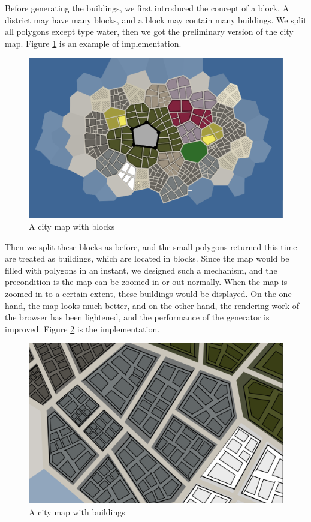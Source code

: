 Before generating the buildings, we first introduced the concept of a block. A district may have many blocks, and a block may contain many buildings. We split all polygons except type water, then we got the preliminary version of the city map. Figure \ref{fig:city blocks} is an example of implementation.

\begin{figure}[htbp]
  \includegraphics[width=\textwidth]{section04/assets/Map-blocks.png}
  \caption{A city map with blocks}
  \label{fig:city blocks}
\end{figure}

Then we split these blocks as before, and the small polygons returned this time are treated as buildings, which are located in blocks. Since the map would be filled with polygons in an instant, we designed such a mechanism, and the precondition is the map can be zoomed in or out normally. When the map is zoomed in to a certain extent, these buildings would be displayed. On the one hand, the map looks much better, and on the other hand, the rendering work of the browser has been lightened, and the performance of the generator is improved. Figure \ref{fig:buildings} is the implementation.

\begin{figure}[htbp]
  \includegraphics[width=\textwidth]{section04/assets/Map-buildings.png}
  \caption{A city map with buildings}
  \label{fig:buildings}
\end{figure}

